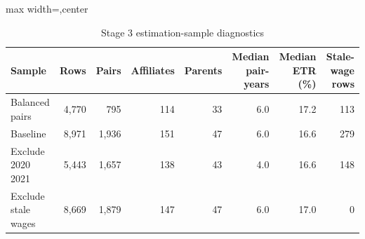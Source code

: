 \begin{table}[H]
\centering
\scriptsize
\caption{Stage 3 estimation-sample diagnostics}
\label{tab:app_stage3_sample_summary}
\begin{adjustbox}{max width=\textwidth,center}
\begin{tabular}{@{}lrrrrrrr@{}}
\toprule
Sample & Rows & Pairs & Affiliates & Parents & Median pair-years & Median ETR (\%) & Stale-wage rows \\
\midrule
Balanced pairs & 4,770 &   795 & 114 & 33 & 6.0 & 17.2 & 113 \\
Baseline & 8,971 & 1,936 & 151 & 47 & 6.0 & 16.6 & 279 \\
Exclude 2020 2021 & 5,443 & 1,657 & 138 & 43 & 4.0 & 16.6 & 148 \\
Exclude stale wages & 8,669 & 1,879 & 147 & 47 & 6.0 & 17.0 &   0 \\
\bottomrule
\end{tabular}
\end{adjustbox}
\end{table}
